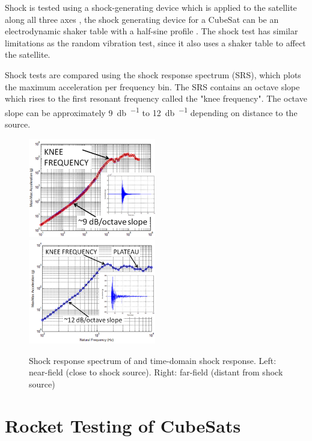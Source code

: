 \documentclass{report}
\begin{document}
Shock is tested using a shock-generating device which is applied to the satellite along all three axes \cite{nasa-gevs,nasa-pyroshock}, the shock generating device for a CubeSat can be an electrodynamic shaker table \cite{nieto2019cubesat} with a half-sine profile \cite{nieto2019cubesat}. The shock test has similar limitations as the random vibration test, since it also uses a shaker table to affect the satellite.

Shock tests are compared using the shock response spectrum (SRS), which plots the maximum acceleration per frequency bin. The SRS contains an octave slope which rises to the first resonant frequency called the "knee frequency". The octave slope can be approximately \SI{9}{\decibel\per\octave} to \SI{12}{\decibel\per\octave} depending on distance to the source.

\begin{figure}[H]
  \includegraphics[width=0.495\textwidth]{images/pyroshock2.png}
  \includegraphics[width=0.495\textwidth]{images/pyroshock1.png}
  \caption{Shock response spectrum of and time-domain shock response. Left: near-field (close to shock source). Right: far-field (distant from shock source) \cite{nasa-pyroshock}}
  \label{fig:pyroshock}
\end{figure}


\section{Rocket Testing of CubeSats}
\end{document}
